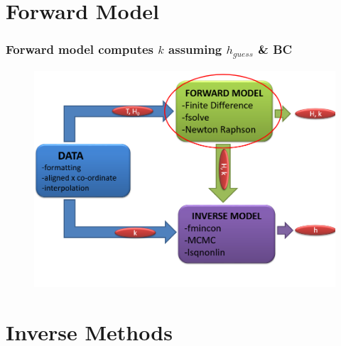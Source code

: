 \documentclass[7pt]{beamer}
\begin{document}
\section{Forward Model}

\begin{frame}
 	\frametitle{Forward model computes $k$ assuming $h_{guess}$ \& BC}
		\begin{figure}[H]
	 		\centering
	 		\includegraphics[width=1.0\linewidth]{img/FWD.png}
	 	\end{figure}
\end{frame}

\section{Inverse Methods}
\end{document}
